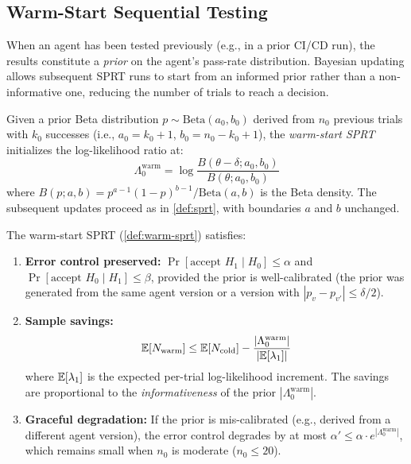 \subsection{Warm-Start Sequential Testing}
\label{sec:token:warm-start}

When an agent has been tested previously (e.g., in a prior CI/CD run),
the results constitute a \emph{prior} on the agent's pass-rate
distribution. Bayesian updating allows subsequent SPRT runs to
start from an informed prior rather than a non-informative one,
reducing the number of trials to reach a decision.

\begin{definition}
\label{def:warm-sprt}
Given a prior Beta distribution $p \sim \text{Beta}(a_0, b_0)$
derived from $n_0$ previous trials with $k_0$ successes (i.e.,
$a_0 = k_0 + 1$, $b_0 = n_0 - k_0 + 1$), the \emph{warm-start SPRT}
initializes the log-likelihood ratio at:
\begin{equation}
\label{eq:warm-start-init}
  \Lambda_0^{\mathrm{warm}} =
    \log\frac{B(\theta - \delta; a_0, b_0)}{B(\theta; a_0, b_0)}
\end{equation}
where $B(p; a, b) = p^{a-1}(1-p)^{b-1} / \mathrm{Beta}(a,b)$ is the
Beta density. The subsequent updates proceed as in
\cref{def:sprt}, with boundaries $a$ and $b$ unchanged.
\end{definition}

\begin{proposition}
\label{prop:warm-start}
The warm-start SPRT (\cref{def:warm-sprt}) satisfies:
\begin{enumerate}[leftmargin=*]
  \item \textbf{Error control preserved:}
    $\Pr[\text{accept } H_1 \mid H_0] \leq \alpha$ and
    $\Pr[\text{accept } H_0 \mid H_1] \leq \beta$, provided the
    prior is well-calibrated (the prior was generated from the same
    agent version or a version with $|p_v - p_{v'}| \leq \delta/2$).
  \item \textbf{Sample savings:}
    \begin{equation}
    \label{eq:warm-savings}
      \mathbb{E}[N_{\mathrm{warm}}] \leq \mathbb{E}[N_{\mathrm{cold}}] -
        \frac{|\Lambda_0^{\mathrm{warm}}|}
             {|\mathbb{E}[\lambda_1]|}
    \end{equation}
    where $\mathbb{E}[\lambda_1]$ is the expected per-trial log-likelihood
    increment. The savings are proportional to the
    \emph{informativeness} of the prior $|\Lambda_0^{\mathrm{warm}}|$.
  \item \textbf{Graceful degradation:} If the prior is
    mis-calibrated (e.g., derived from a different agent version), the
    error control degrades by at most
    $\alpha' \leq \alpha \cdot e^{|\Lambda_0^{\mathrm{warm}}|}$, which
    remains small when $n_0$ is moderate ($n_0 \leq 20$).
\end{enumerate}
\end{proposition}

